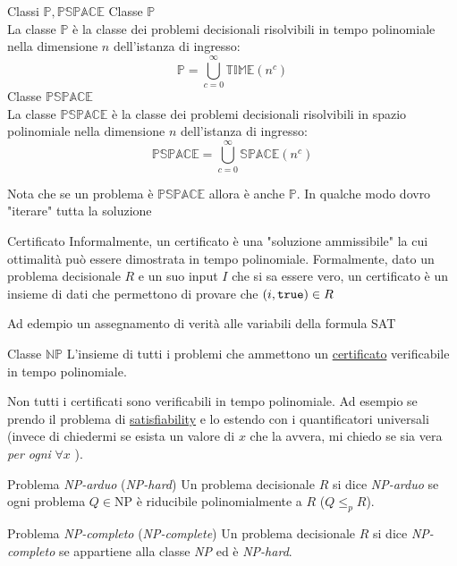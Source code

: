 \begin{definizione}{Classi $\mathbb{P, PSPACE}$}
	Classe $ \mathbb{P} $\\
	La classe $ \mathbb{P} $ è la classe dei problemi decisionali risolvibili in tempo polinomiale nella dimensione $n$ dell'istanza di ingresso:
	\[
		\mathbb{P} = \bigcup_{c=0}^{\infty} \mathbb{TIME}(n^c)
	\]
	\vskip3mm
	Classe $ \mathbb{PSPACE} $\\
	La classe $ \mathbb{PSPACE} $ è la classe dei problemi decisionali risolvibili in spazio polinomiale nella dimensione $n$ dell'istanza di ingresso:
	\[
		\mathbb{PSPACE} = \bigcup_{c=0}^{\infty} \mathbb{SPACE}(n^c)
	\]
\end{definizione}
Nota che se un problema è $ \mathbb{PSPACE} $ allora è anche $ \mathbb{P} $. In qualche modo dovro "iterare" tutta la soluzione

\begin{definizione}{Certificato}\label{certificato}
	Informalmente, un certificato  è una "soluzione ammissibile" la cui ottimalità può essere dimostrata in tempo polinomiale.
	\vskip3mm
	Formalmente, dato un problema decisionale $ R $ e un suo input $ I $ che si sa essere vero, un certificato è un insieme di dati che permettono di provare che $ \left(i, \text{\ttfamily{true}}\right) \in R $
\end{definizione}
Ad edempio un assegnamento di verità alle variabili della formula SAT
\begin{definizione}{Classe $ \mathbb{NP} $}
	L’insieme di tutti i problemi che ammettono un \hyperref[certificato]{certificato} verificabile in tempo polinomiale.
\end{definizione}
Non tutti i certificati sono verificabili in tempo polinomiale. Ad esempio se prendo il problema di \hyperref[satisfiability]{satisfiability} e lo estendo con i quantificatori universali (invece di chiedermi se esista un valore di $ x $ che la avvera, mi chiedo se sia vera \textit{per ogni} $ \forall  x$ ).

\begin{definizione}{Problema \textit{NP-arduo} (\textit{NP-hard})}
	Un problema decisionale $R$ si dice \textit{NP-arduo} se ogni problema $Q \in \text{NP}$ è riducibile polinomialmente a $R$ ($Q \leq_p R$).
\end{definizione}

\begin{definizione}{Problema \textit{NP-completo} (\textit{NP-complete})}
	Un problema decisionale $R$ si dice \textit{NP-completo} se appartiene alla classe \textit{NP} ed è \textit{NP-hard}.
\end{definizione}

